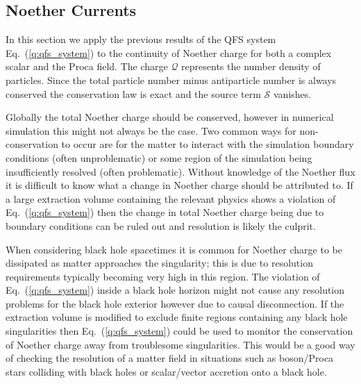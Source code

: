 \subsection{Noether Currents} \label{q:sect:noether}

In this section we apply the previous results of the QFS system Eq.~(\ref{q:qfs_system})
to the continuity of Noether charge for both a complex scalar and the Proca field. The charge $\mathcal{Q}$ represents the number density of particles. Since the total particle number minus antiparticle number is always conserved the conservation law is exact and the source term $\mathcal{S}$ vanishes. 

Globally the total Noether charge should be conserved, however in numerical simulation this might not always be the case. Two common ways for non-conservation to occur are for the matter to interact with the simulation boundary conditions (often unproblematic) or some region of the simulation being insufficiently resolved (often problematic). Without knowledge of the Noether flux it is difficult to know what a change in Noether charge should be attributed to. If a large extraction volume containing the relevant physics shows a violation of Eq.~(\ref{q:qfs_system}) then the change in total Noether charge being due to boundary conditions can be ruled out and resolution is likely the culprit. 

When considering black hole spacetimes it is common for Noether charge to be dissipated as matter approaches the singularity; this is due to resolution requirements typically becoming very high in this region. The violation of Eq.~(\ref{q:qfs_system}) inside a black hole horizon might not cause any resolution problems for the black hole exterior however due to causal disconnection. If the extraction volume is modified to exclude finite regions containing any black hole singularities then Eq.~(\ref{q:qfs_system}) could be used to monitor the conservation of Noether charge away from troublesome singularities. This would be a good way of checking the resolution of a matter field in situations such as boson/Proca stars colliding with black holes or scalar/vector accretion onto a black hole.




